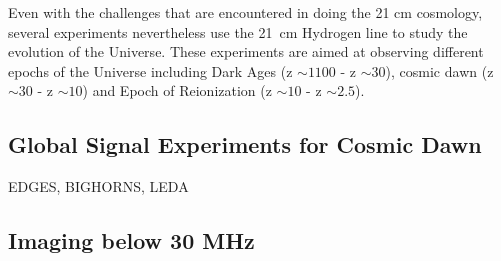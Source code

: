 \documentclass[12pt,a4paper]{report}
\begin{document}
	
	
	Even with the challenges that are encountered in doing the 21 cm cosmology, several experiments nevertheless use the \SI{21}{cm} Hydrogen line to study the evolution of the Universe. These experiments are aimed at observing different epochs of the Universe including Dark Ages (z $\sim1100$ - z $\sim30$), cosmic dawn (z $\sim30$ - z $\sim10$) and Epoch of Reionization (z $\sim10$ - z $\sim2.5$). \\
	
		
		\subsection{Global Signal Experiments for Cosmic Dawn}
		
		EDGES, BIGHORNS, LEDA
		
		\subsection{Imaging below 30 MHz}
	
\end{document}

